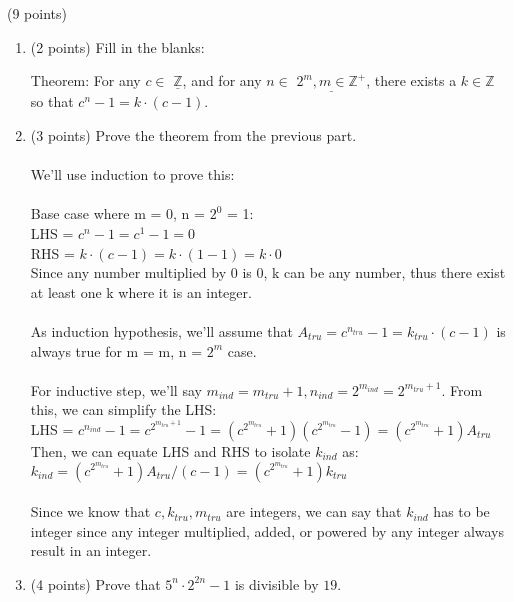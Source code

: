 
\item (9 points)
\begin{enumerate}
     \item (2 points) Fill in the blanks:
     
     Theorem: For any $c\in$  $\underline{\mathbb{Z}}$, and for any $n\in$ $\underline{2^m, m \in \mathbb{Z^{+}}}$, there exists a $k\in\mathbb{Z}$ so that $\displaystyle c^n-1 = k\cdot(c-1)$.
     \\

    \item (3 points) Prove the theorem from the previous part.
    \\
    \\We'll use induction to prove this:
    \\
    \\Base case where m = 0, n = $2^0$ = 1:
    \\LHS = $c^n-1 = c^1-1 = 0$
    \\RHS = $k\cdot(c-1) = k\cdot(1-1) = k\cdot0$
    \\Since any number multiplied by 0 is 0, k can be any number, thus there exist at least one k where it is an integer.
    \\
    \\As induction hypothesis, we'll assume that $\displaystyle A_{tru} = c^{n_{tru}}-1 = k_{tru}\cdot(c-1)$ is always true for m = m, n = $2^m$ case.
    \\
    \\ For inductive step, we'll say $m_{ind} = m_{tru}+1, n_{ind} = 2^{m_{ind}} = 2^{m_{tru}+1}$. From this, we can simplify the LHS:
    \\LHS = $\displaystyle c^{n_{ind}}-1 = c^{2^{m_{tru}+1}}-1= (c^{2^{m_{tru}}}+1)(c^{2^{m_{tru}}}-1) = (c^{2^{m_{tru}}}+1)A_{tru}$
    \\ Then, we can equate LHS and RHS to isolate $k_{ind}$ as:
    \\ $k_{ind} = (c^{2^{m_{tru}}}+1)A_{tru}/(c-1) = (c^{2^{m_{tru}}}+1)k_{tru}$
    \\
    \\ Since we know that $c, k_{tru}, m_{tru}$ are integers, we can say that $k_{ind}$ has to be integer since any integer multiplied, added, or powered by any integer always result in an integer.
    \\$\boxed{}$
    \\
    \item (4 points) Prove that $\displaystyle 5^n\cdot2^{2n} - 1$ is divisible by $19$.
    \\

\end{enumerate}

